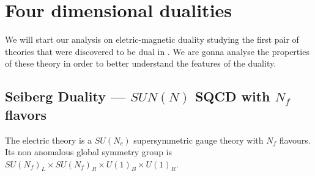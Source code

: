 \section{Four dimensional dualities}

We will start our analysis on eletric-magnetic duality studying the first pair of theories that were discovered to be dual in \cite{Seiberg:1994pq}.  
We are gonna analyse the properties of these theory in order to better understand the features of the duality.

\subsection*{Seiberg Duality --- $SUN(N)$ SQCD with $N_f$ flavors}
The electric theory is a $SU(N_c) $ supersymmetric gauge theory with $N_f$ flavours.
Its non anomalous global symmetry group is $SU(N_f)_L \times SU(N_f)_R \times U(1)_B \times U(1)_R $. 

